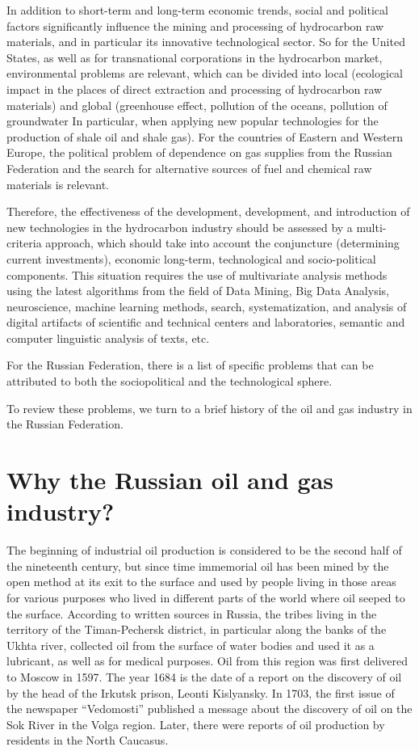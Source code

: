 \documentclass[12pt]{report}
\theoremstyle{definition}
\begin{document}
In addition to short-term and long-term economic trends, social and political factors significantly influence the mining and processing of hydrocarbon raw materials, and in particular its innovative technological sector.
So for the United States, as well as for transnational corporations in the hydrocarbon market, environmental problems are relevant, which can be divided into local (ecological impact in the places of direct extraction and processing of hydrocarbon raw materials) and global (greenhouse effect, pollution of the oceans, pollution of groundwater In particular, when applying new popular technologies for the production of shale oil and shale gas).
For the countries of Eastern and Western Europe, the political problem of dependence on gas supplies from the Russian Federation and the search for alternative sources of fuel and chemical raw materials is relevant.

Therefore, the effectiveness of the development, development, and introduction of new technologies in the hydrocarbon industry should be assessed by a multi-criteria approach, which should take into account the conjuncture (determining current investments), economic long-term, technological and socio-political components.
This situation requires the use of multivariate analysis methods using the latest algorithms from the field of Data Mining, Big Data Analysis, neuroscience, machine learning methods, search, systematization, and analysis of digital artifacts of scientific and technical centers and laboratories, semantic and computer linguistic analysis of texts, etc.

For the Russian Federation, there is a list of specific problems that can be attributed to both the sociopolitical and the technological sphere.

To review these problems, we turn to a brief history of the oil and gas industry in the Russian Federation.

\section{Why the Russian oil and gas industry?}
The beginning of industrial oil production is considered to be the second half of the nineteenth century, but since time immemorial oil has been mined by the open method at its exit to the surface and used by people living in those areas for various purposes who lived in different parts of the world where oil seeped to the surface.
According to written sources in Russia, the tribes living in the territory of the Timan-Pechersk district, in particular along the banks of the Ukhta river, collected oil from the surface of water bodies and used it as a lubricant, as well as for medical purposes.
Oil from this region was first delivered to Moscow in 1597.
The year 1684 is the date of a report on the discovery of oil by the head of the Irkutsk prison, Leonti Kislyansky.
In 1703, the first issue of the newspaper ``Vedomosti'' published a message about the discovery of oil on the Sok River in the Volga region.
Later, there were reports of oil production by residents in the North Caucasus.
\end{document}
